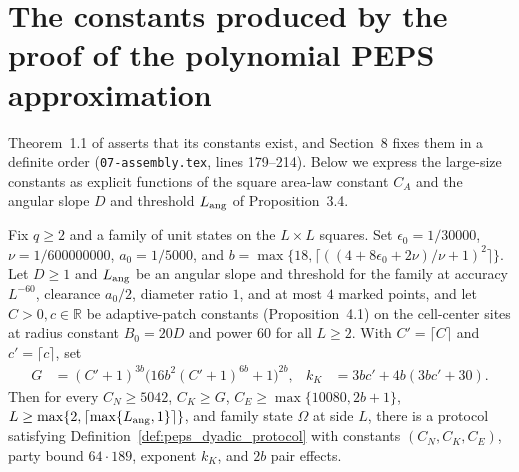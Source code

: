 \section{The constants produced by the proof of the polynomial PEPS approximation}
\label{sec:polynomial_peps_explicit_constants}

Theorem~1.1 of \cite{OpenAI2026PolynomialPEPS} asserts that its constants exist, and Section~8 fixes them in a definite order (\texttt{07-assembly.tex}, lines 179--214). Below we express the large-size constants as explicit functions of the square area-law constant $C_A$ and the angular slope $D$ and threshold $L_{\rm ang}$ of Proposition~3.4.


\begin{lemma}
    \label{lem:peps_dyadic_protocol_at_given_scale}
    \leanok
    Fix $q\ge2$ and a family of unit states on the $L\times L$ squares. Set $\epsilon_0=1/30000$, $\nu=1/600000000$, $a_0=1/5000$, and $b=\max\{18,\lceil((4+8\epsilon_0+2\nu)/\nu+1)^2\rceil\}$. Let $D\ge1$ and $L_{\rm ang}$ be an angular slope and threshold for the family at accuracy $L^{-60}$, clearance $a_0/2$, diameter ratio $1$, and at most $4$ marked points, and let $C>0,c\in\mathbb R$ be adaptive-patch constants (Proposition~4.1) on the cell-center sites at radius constant $B_0=20D$ and power $60$ for all $L\ge2$. With $C'=\lceil C\rceil$ and $c'=\lceil c\rceil$, set
    \begin{align}
        G   & =(C'+1)^{3b}\bigl(16b^2(C'+1)^{6b}+1\bigr)^{2b}, &
        k_K & =3bc'+4b(3bc'+30).
    \end{align}
    Then for every $C_N\ge5042$, $C_K\ge G$, $C_E\ge\max\{10080,2b+1\}$, $L\ge\max\{2,\lceil\max\{L_{\rm ang},1\}\rceil\}$, and family state $\Omega$ at side $L$, there is a protocol satisfying Definition~\ref{def:peps_dyadic_protocol} with constants $(C_N,C_K,C_E)$, party bound $64\cdot189$, exponent $k_K$, and $2b$ pair effects.
\end{lemma}

